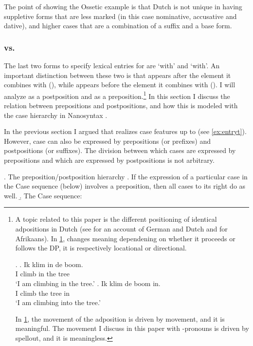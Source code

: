 \documentclass[12pt]{article}
\begin{document}
The point of showing the Ossetic example is that Dutch is not unique in having suppletive forms that are less marked (in this case nominative, accusative and dative), and higher cases that are a combination of a suffix and a base form.



\subsubsection{ vs. }

The last two forms to specify lexical entries for are  `with' and  `with'. An important distinction between these two is that  appears after the element it combines with (), while  appears before the element it combines with (). I will analyze  as a postposition and  as a preposition.\footnote{A topic related to this paper is the different positioning of identical adpositions in Dutch (see \citet{caha2010} for an account of German and Dutch and \citet{pretorius2017} for Afrikaans). In \ref{ex:dutchin},  changes meaning dependening on whether it proceeds or follows the DP, it is respectively locational or directional.

\ex.\label{ex:dutchin}
\ag. Ik klim in de boom.\\
 I climb in the tree\\
 `I am climbing in the tree.'
\bg. Ik klim de boom in.\\
 I climb the tree in\\
 `I am climbing into the tree.'

In \ref{ex:dutchin}, the movement of the adposition is driven by movement, and it is meaningful. The movement I discuss in this paper with -pronouns is driven by spellout, and it is meaningless.} In this section I discuss the relation between prepositions and postpositions, and how this is modeled with the case hierarchy in Nanosyntax \citep{caha2009}.

In the previous section I argued that  realizes case features up to  (see \ref{ex:entryt}). However, case can also be expressed by prepositions (or prefixes) and postpositions (or suffixes). The division between which cases are expressed by prepositions and which are expressed by postpositions is not arbitrary.

\ex. The preposition/postposition hierarchy
\a. If the expression of a particular case in the Case sequence (below) involves a preposition, then all cases to its right do as well.
\b. The Case sequence:  \hfill \citep{caha2009}
\end{document}
